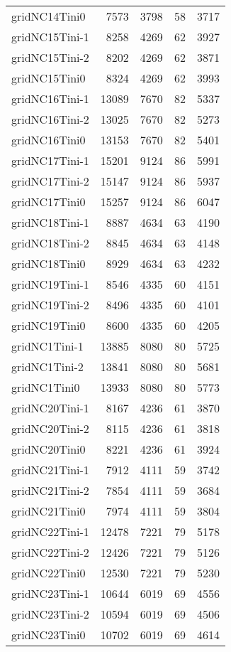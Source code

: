 \begin{longtable}{lrrrr}
gridNC14Tini0 & 7573 & 3798 & 58 & 3717 \\
gridNC15Tini-1 & 8258 & 4269 & 62 & 3927 \\
gridNC15Tini-2 & 8202 & 4269 & 62 & 3871 \\
gridNC15Tini0 & 8324 & 4269 & 62 & 3993 \\
gridNC16Tini-1 & 13089 & 7670 & 82 & 5337 \\
gridNC16Tini-2 & 13025 & 7670 & 82 & 5273 \\
gridNC16Tini0 & 13153 & 7670 & 82 & 5401 \\
gridNC17Tini-1 & 15201 & 9124 & 86 & 5991 \\
gridNC17Tini-2 & 15147 & 9124 & 86 & 5937 \\
gridNC17Tini0 & 15257 & 9124 & 86 & 6047 \\
gridNC18Tini-1 & 8887 & 4634 & 63 & 4190 \\
gridNC18Tini-2 & 8845 & 4634 & 63 & 4148 \\
gridNC18Tini0 & 8929 & 4634 & 63 & 4232 \\
gridNC19Tini-1 & 8546 & 4335 & 60 & 4151 \\
gridNC19Tini-2 & 8496 & 4335 & 60 & 4101 \\
gridNC19Tini0 & 8600 & 4335 & 60 & 4205 \\
gridNC1Tini-1 & 13885 & 8080 & 80 & 5725 \\
gridNC1Tini-2 & 13841 & 8080 & 80 & 5681 \\
gridNC1Tini0 & 13933 & 8080 & 80 & 5773 \\
gridNC20Tini-1 & 8167 & 4236 & 61 & 3870 \\
gridNC20Tini-2 & 8115 & 4236 & 61 & 3818 \\
gridNC20Tini0 & 8221 & 4236 & 61 & 3924 \\
gridNC21Tini-1 & 7912 & 4111 & 59 & 3742 \\
gridNC21Tini-2 & 7854 & 4111 & 59 & 3684 \\
gridNC21Tini0 & 7974 & 4111 & 59 & 3804 \\
gridNC22Tini-1 & 12478 & 7221 & 79 & 5178 \\
gridNC22Tini-2 & 12426 & 7221 & 79 & 5126 \\
gridNC22Tini0 & 12530 & 7221 & 79 & 5230 \\
gridNC23Tini-1 & 10644 & 6019 & 69 & 4556 \\
gridNC23Tini-2 & 10594 & 6019 & 69 & 4506 \\
gridNC23Tini0 & 10702 & 6019 & 69 & 4614 \\

\end{longtable}

